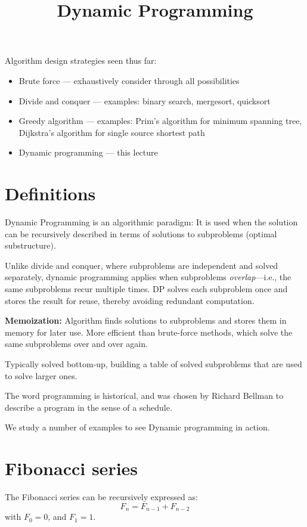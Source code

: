 \documentclass{article}
\title{Dynamic Programming}
\author{}
\date{}
\begin{document}
\maketitle

Algorithm design strategies seen thus far:
\begin{itemize}
    \item Brute force — exhaustively consider through all possibilities
    \item Divide and conquer — examples: binary search, mergesort, quicksort
    \item Greedy algorithm — examples: Prim's algorithm for minimum spanning tree, Dijkstra's algorithm for single source shortest path
    \item Dynamic programming — this lecture
\end{itemize}

\section{Definitions}

Dynamic Programming is an algorithmic paradigm: It is used when the solution can be recursively described in terms of solutions to subproblems (optimal substructure).

Unlike divide and conquer, where subproblems are independent and solved separately, dynamic programming applies when subproblems \textit{overlap}—i.e., the same subproblems recur multiple times. DP solves each subproblem once and stores the result for reuse, thereby avoiding redundant computation.

\textbf{Memoization:} Algorithm finds solutions to subproblems and stores them in memory for later use.  
More efficient than brute-force methods, which solve the same subproblems over and over again.

Typically solved bottom-up, building a table of solved subproblems that are used to solve larger ones.  


The word programming is historical, and was chosen by Richard Bellman to describe a program in the sense of a schedule.

We study a number of examples to see Dynamic programming in action.

\section{Fibonacci series}

The Fibonacci series can be recursively expressed as:
\[
F_n = F_{n-1} + F_{n-2}
\]
with \(F_0 = 0\), and \(F_1 = 1\).
\end{document}
